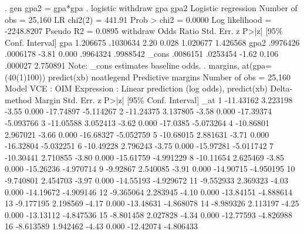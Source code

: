 . gen gpa2 = gpa*gpa
{\smallskip}
. logistic withdraw gpa gpa2
{\smallskip}
Logistic regression                             Number of obs     =     25,160
                                                LR chi2(2)        =     441.91
                                                Prob > chi2       =     0.0000
Log likelihood = -2248.8207                     Pseudo R2         =     0.0895
{\smallskip}
    withdraw {\VBAR} Odds Ratio   Std. Err.      z    P>|z|     [95\% Conf. Interval]
         gpa {\VBAR}   1.206675   .1030634     2.20   0.028     1.020677    1.426568
        gpa2 {\VBAR}   .9976426   .0006178    -3.81   0.000     .9964324    .9988542
       _cons {\VBAR}   .0086151   .0253454    -1.62   0.106      .000027    2.750891
Note: _cons estimates baseline odds.
{\smallskip}
. margins, at(gpa=(40(1)100)) predict(xb) noatlegend
{\smallskip}
Predictive margins                              Number of obs     =     25,160
Model VCE    : OIM
{\smallskip}
Expression   : Linear prediction (log odds), predict(xb)
{\smallskip}
             {\VBAR}            Delta-method
             {\VBAR}     Margin   Std. Err.      z    P>|z|     [95\% Conf. Interval]
         _at {\VBAR}
          1  {\VBAR}  -11.43162   3.223198    -3.55   0.000    -17.74897   -5.114267
          2  {\VBAR}  -11.24375   3.137805    -3.58   0.000    -17.39374   -5.093766
          3  {\VBAR}  -11.05588   3.052413    -3.62   0.000     -17.0385   -5.073264
          4  {\VBAR}  -10.86801   2.967021    -3.66   0.000    -16.68327   -5.052759
          5  {\VBAR}  -10.68015   2.881631    -3.71   0.000    -16.32804   -5.032251
          6  {\VBAR}  -10.49228   2.796243    -3.75   0.000    -15.97281   -5.011742
          7  {\VBAR}  -10.30441   2.710855    -3.80   0.000    -15.61759   -4.991229
          8  {\VBAR}  -10.11654   2.625469    -3.85   0.000    -15.26236   -4.970714
          9  {\VBAR}   -9.92867   2.540085    -3.91   0.000    -14.90715   -4.950195
         10  {\VBAR}  -9.740801   2.454703    -3.97   0.000    -14.55193   -4.929672
         11  {\VBAR}  -9.552933   2.369323    -4.03   0.000    -14.19672   -4.909146
         12  {\VBAR}  -9.365064   2.283945    -4.10   0.000    -13.84151   -4.888614
         13  {\VBAR}  -9.177195   2.198569    -4.17   0.000    -13.48631   -4.868078
         14  {\VBAR}  -8.989326   2.113197    -4.25   0.000    -13.13112   -4.847536
         15  {\VBAR}  -8.801458   2.027828    -4.34   0.000    -12.77593   -4.826988
         16  {\VBAR}  -8.613589   1.942462    -4.43   0.000    -12.42074   -4.806433
